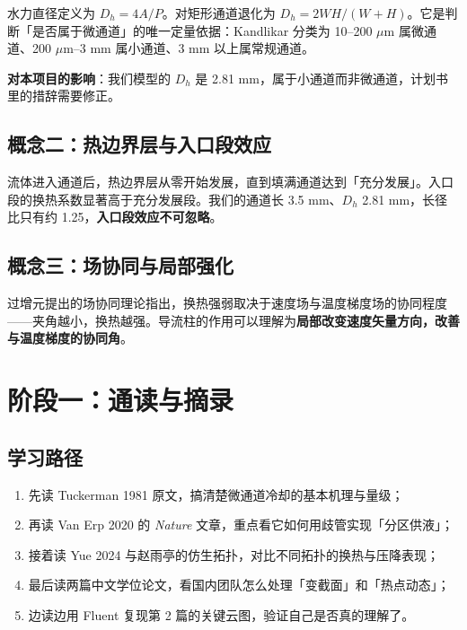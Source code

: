 \documentclass[stage1]{ydzjreport}
\begin{document}
水力直径定义为 $D_h = 4A/P$。对矩形通道退化为 $D_h = 2WH/(W+H)$。它是判断「是否属于微通道」的唯一定量依据：Kandlikar 分类为 10--200 $\mu$m 属微通道、200 $\mu$m--3 mm 属小通道、3 mm 以上属常规通道。

\begin{notebox}
\textbf{对本项目的影响}：我们模型的 $D_h$ 是 2.81 mm，属于小通道而非微通道，计划书里的措辞需要修正。
\end{notebox}

\subsection{概念二：热边界层与入口段效应}

流体进入通道后，热边界层从零开始发展，直到填满通道达到「充分发展」。入口段的换热系数显著高于充分发展段。我们的通道长 3.5 mm、$D_h$ 2.81 mm，长径比只有约 1.25，\textbf{入口段效应不可忽略}。

\subsection{概念三：场协同与局部强化}

过增元提出的场协同理论指出，换热强弱取决于速度场与温度梯度场的协同程度——夹角越小，换热越强。导流柱的作用可以理解为\textbf{局部改变速度矢量方向，改善与温度梯度的协同角}。

\section{阶段一：通读与摘录}

\subsection{学习路径}

\begin{enumerate}
  \item 先读 Tuckerman 1981 原文，搞清楚微通道冷却的基本机理与量级；
  \item 再读 Van Erp 2020 的 \textit{Nature} 文章，重点看它如何用歧管实现「分区供液」；
  \item 接着读 Yue 2024 与赵雨亭的仿生拓扑，对比不同拓扑的换热与压降表现；
  \item 最后读两篇中文学位论文，看国内团队怎么处理「变截面」和「热点动态」；
  \item 边读边用 Fluent 复现第 2 篇的关键云图，验证自己是否真的理解了。
\end{enumerate}
\end{document}
